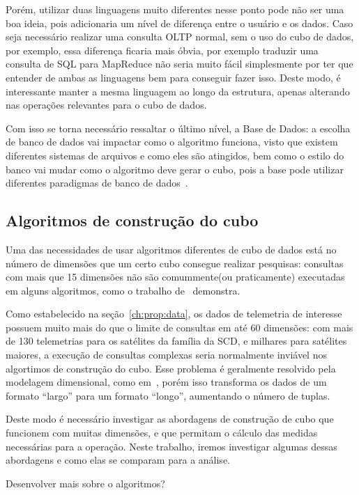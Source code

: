 Porém, utilizar duas linguagens muito diferentes nesse ponto pode não ser uma boa ideia, pois adicionaria um nível de diferença entre o usuário e os dados.
Caso seja necessário realizar uma consulta OLTP normal, sem o uso do cubo de dados, por exemplo, essa diferença ficaria mais óbvia, por exemplo traduzir uma consulta de SQL para MapReduce não seria muito fácil simplesmente por ter que entender de ambas as linguagens bem para conseguir fazer isso.
Deste modo, é interessante manter a mesma linguagem ao longo da estrutura, apenas alterando nas operações relevantes para o cubo de dados.

Com isso se torna necessário ressaltar o último nível, a Base de Dados: a escolha de banco de dados vai impactar como o algoritmo funciona, visto que existem diferentes sistemas de arquivos e como eles são atingidos, bem como o estilo do banco vai mudar como o algoritmo deve gerar o cubo, pois a base pode utilizar diferentes paradigmas de banco de dados~\cite{cuzzocreaDataWarehousingOLAP2013}.

\subsection{Algoritmos de construção do cubo}\label{ch:prop:cubearch:algo}

Uma das necessidades de usar algoritmos diferentes de cubo de dados está no número de dimensões que um certo cubo consegue realizar pesquisas: consultas com mais que 15 dimensões não são comummente(ou praticamente) executadas em alguns algoritmos, como o trabalho de~\cite{silva:2015:abordagensParaCubo} demonstra.

{\color{red}
Como estabelecido na seção~\ref{ch:prop:data}, os dados de telemetria de interesse possuem muito mais do que o limite de consultas em até 60 dimensões: com mais de 130 telemetrias para os satélites da família da SCD, e milhares para satélites maiores, a execução de consultas complexas seria normalmente inviável nos algortimos de construção do cubo.
}
Esse problema é geralmente resolvido pela modelagem dimensional, como em~\cite{AzevedoAmbr:2010:ArSaTe}, porém isso transforma os dados de um formato ``largo'' para um formato ``longo'', aumentando o número de tuplas.

Deste modo é necessário investigar as abordagens de construção de cubo que funcionem com muitas dimensões, e que permitam o cálculo das medidas necessárias para a operação.
Neste trabalho, iremos investigar algumas dessas abordagens e como elas se comparam para a análise.

{\color{red} Desenvolver mais sobre o algoritmos?}

